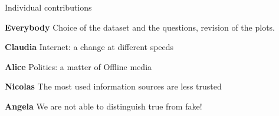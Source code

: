 \documentclass[10pt, aspectratio=169, compress, protectframetitle, handout]{beamer}
\begin{document}
{
\begin{frame}[plain]
%  
\end{frame}
}

\begin{frame}{Individual contributions}

    {\Huge\uncover<+->{\Ladiesroom}}{\Huge\uncover<+->{\Ladiesroom}}{\Huge\uncover<+->{\Ladiesroom}}{\Huge\uncover<+->{\Gentsroom}} \alert{\textbf{Everybody}} Choice of the dataset and the questions, revision of the plots.

    {\Huge\uncover<+->{\Ladiesroom}} \alert{\textbf{Claudia}} Internet: a change at different speeds
    
    {\Huge\uncover<+->{\Ladiesroom}} \alert{\textbf{Alice}} Politics: a matter of Offline media
    
    {\Huge\uncover<+->{\Gentsroom}} \alert{\textbf{Nicolas}} The most used information sources are less trusted
    
    {\Huge\uncover<+->{\Ladiesroom}} \alert{\textbf{Angela}} We are not able to distinguish true from fake!

\end{frame}


    
\end{document}
